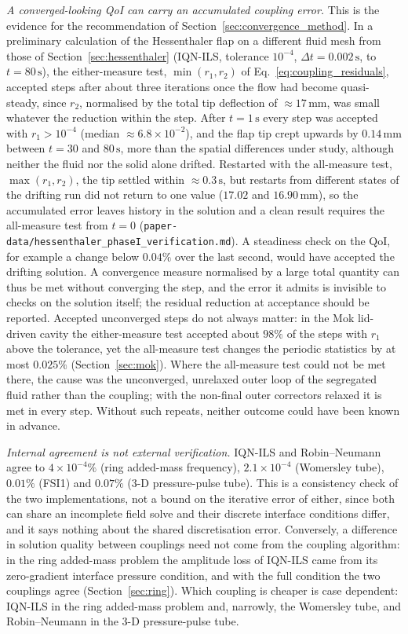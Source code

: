 \emph{A converged-looking QoI can carry an accumulated coupling error.}
This is the evidence for the recommendation of Section~\ref{sec:convergence_method}.
In a preliminary calculation of the Hessenthaler flap on a different fluid mesh from those of Section~\ref{sec:hessenthaler} (IQN-ILS, tolerance $10^{-4}$, $\Delta t = 0.002\,\mathrm{s}$, to $t = 80\,\mathrm{s}$), the either-measure test, $\min(r_1, r_2)$ of Eq.~\eqref{eq:coupling_residuals}, accepted steps after about three iterations once the flow had become quasi-steady, since $r_2$, normalised by the total tip deflection of $\approx17\,\mathrm{mm}$, was small whatever the reduction within the step.
After $t = 1\,\mathrm{s}$ every step was accepted with $r_1 > 10^{-4}$ (median $\approx6.8\times10^{-2}$), and the flap tip crept upwards by $0.14\,\mathrm{mm}$ between $t = 30$ and $80\,\mathrm{s}$, more than the spatial differences under study, although neither the fluid nor the solid alone drifted.
Restarted with the all-measure test, $\max(r_1, r_2)$, the tip settled within $\approx0.3\,\mathrm{s}$, but restarts from different states of the drifting run did not return to one value ($17.02$ and $16.90\,\mathrm{mm}$), so the accumulated error leaves history in the solution and a clean result requires the all-measure test from $t = 0$ (\texttt{paper-data/hessenthaler\_phaseI\_verification.md}).
A steadiness check on the QoI, for example a change below $0.04\%$ over the last second, would have accepted the drifting solution.
A convergence measure normalised by a large total quantity can thus be met without converging the step, and the error it admits is invisible to checks on the solution itself; the residual reduction at acceptance should be reported.
Accepted unconverged steps do not always matter: in the Mok lid-driven cavity the either-measure test accepted about $98\%$ of the steps with $r_1$ above the tolerance, yet the all-measure test changes the periodic statistics by at most $0.025\%$ (Section~\ref{sec:mok}).
Where the all-measure test could not be met there, the cause was the unconverged, unrelaxed outer loop of the segregated fluid rather than the coupling; with the non-final outer correctors relaxed it is met in every step.
Without such repeats, neither outcome could have been known in advance.

\emph{Internal agreement is not external verification.}
IQN-ILS and Robin--Neumann agree to $4\times10^{-4}\%$ (ring added-mass frequency), $2.1\times10^{-4}$ (Womersley tube), $0.01\%$ (FSI1) and $0.07\%$ (3-D pressure-pulse tube).
This is a consistency check of the two implementations, not a bound on the iterative error of either, since both can share an incomplete field solve and their discrete interface conditions differ, and it says nothing about the shared discretisation error.
Conversely, a difference in solution quality between couplings need not come from the coupling algorithm: in the ring added-mass problem the amplitude loss of IQN-ILS came from its zero-gradient interface pressure condition, and with the full condition the two couplings agree (Section~\ref{sec:ring}).
Which coupling is cheaper is case dependent: IQN-ILS in the ring added-mass problem and, narrowly, the Womersley tube, and Robin--Neumann in the 3-D pressure-pulse tube.

